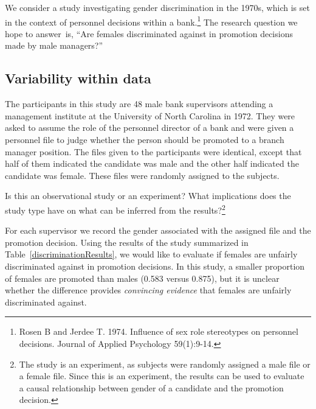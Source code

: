 


We consider a study investigating gender discrimination in the 1970s, which is set in the context of personnel decisions within a bank.\footnote{Rosen B and Jerdee T. 1974. Influence of sex role stereotypes on personnel decisions. Journal of Applied Psychology 59(1):9-14.} The research question we hope to answer~is, ``Are females discriminated against in promotion decisions made by male managers?''

\subsection{Variability within data}
\label{variabilityWithinData}

The participants in this study are 48 male bank supervisors attending a management institute at the University of North Carolina in 1972. They were asked to assume the role of the personnel director of a bank and were given a personnel file to judge whether the person should be promoted to a branch manager position. The files given to the participants were identical, except that half of them indicated the candidate was male and the other half indicated the candidate was female. These files were randomly assigned to the subjects.

\begin{exercise}
Is this an observational study or an experiment? What implications does the study type have on what can be inferred from the results?\footnote{The study is an experiment, as subjects were randomly assigned a male file or a female file. Since this is an experiment, the results can be used to evaluate a causal relationship between gender of a candidate and the promotion decision.}
\end{exercise}

For each supervisor we record the gender associated with the assigned file and the promotion decision. Using the results of the study summarized in Table~\ref{discriminationResults}, we would like to evaluate if females are unfairly discriminated against in promotion decisions. In this study, a smaller proportion of females are promoted than males (0.583 versus 0.875), but it is unclear whether the difference provides \emph{convincing evidence} that females are unfairly discriminated against.

